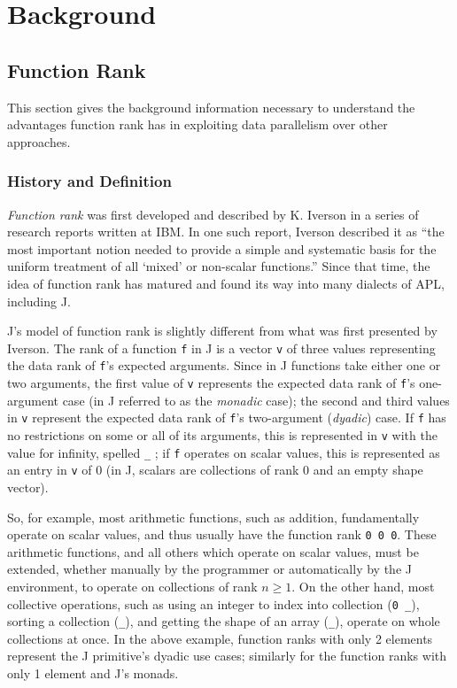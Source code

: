 \chapter{Background}
\label{back}

\section{Function Rank}
This section gives the background information necessary to understand 
the advantages function rank has in exploiting data parallelism over other approaches.

\subsection{History and Definition}
\textit{Function rank} was first developed and described by K. Iverson in a series of research reports written at IBM\cite{rapl}\cite{opandfunc}. 
In one such report, Iverson described it as 
``the most important notion needed to provide a simple and systematic basis for the uniform treatment of all `mixed' or non-scalar functions.''\cite{rapl} %
Since that time, the idea of function rank has matured and found its way into many dialects of APL, including J.

J's model of function rank is slightly different from what was first presented by Iverson. \cite{rankanduni} \cite{jvocab}
The rank of a function \texttt{f} in J is a vector \texttt{v} of three values representing the data rank of \texttt{f}'s expected arguments.
Since in J functions take either one or two arguments, 
the first value of \texttt{v} represents the expected data rank of \texttt{f}'s one-argument case (in J referred to as the \textit{monadic} case);
the second and third values in \texttt{v} represent the expected data rank of \texttt{f}'s two-argument (\textit{dyadic}) case.
If \texttt{f} has no restrictions on some or all of its arguments, 
this is represented in \texttt{v} with the value for infinity, spelled \texttt{\_} ;
if \texttt{f} operates on scalar values, this is represented as an entry in \texttt{v} of 0 
(in J, scalars are collections of rank 0 and an empty shape vector). %

So, for example, most arithmetic functions, such as addition, 
fundamentally operate on scalar values, and thus usually have the function rank \texttt{0 0 0}.
These arithmetic functions, and all others which operate on scalar values, 
must be extended, whether manually by the programmer or automatically by the J environment, 
to operate on collections of rank $n \ge 1$.
On the other hand, most collective operations, such as using an integer to index into collection (\texttt{0 \_}), 
sorting a collection (\texttt{\_}), and getting the shape of an array (\texttt{\_}), operate on whole collections at once.
In the above example, function ranks with only 2 elements represent the J primitive's dyadic use cases; 
similarly for the function ranks with only 1 element and J's monads. %

